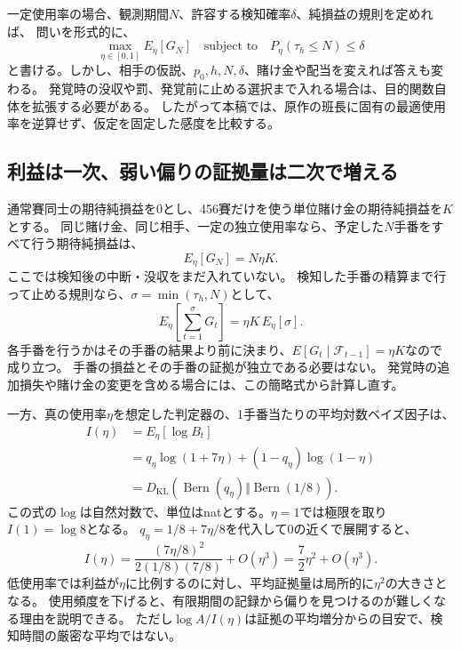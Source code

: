 \documentclass[11pt,a4paper]{article}
\numberwithin{equation}{section}
\begin{document}
一定使用率の場合、観測期間$N$、許容する検知確率$\delta$、純損益の規則を定めれば、
問いを形式的に、
\begin{equation}
\max_{\eta\in[0,1]}E_\eta[G_N]\quad
\text{subject to}\quad P_\eta(\tau_h\le N)\le\delta
\label{eq:tradeoff}
\end{equation}
と書ける。しかし、相手の仮説、$p_0,h,N,\delta$、賭け金や配当を変えれば答えも変わる。
発覚時の没収や罰、発覚前に止める選択まで入れる場合は、目的関数自体を拡張する必要がある。
したがって本稿では、原作の班長に固有の最適使用率を逆算せず、仮定を固定した感度を比較する。

\subsection{利益は一次、弱い偏りの証拠量は二次で増える}
通常賽同士の期待純損益を0とし、456賽だけを使う単位賭け金の期待純損益を$K$とする。
同じ賭け金、同じ相手、一定の独立使用率なら、予定した$N$手番をすべて行う期待純損益は、
\begin{equation}
E_\eta[G_N]=N\eta K.
\label{eq:linear-gain}
\end{equation}
ここでは検知後の中断・没収をまだ入れていない。
検知した手番の精算まで行って止める規則なら、$\sigma=\min(\tau_h,N)$として、
\begin{equation}
E_\eta\!\left[\sum_{t=1}^{\sigma}G_t\right]
=\eta K\,E_\eta[\sigma].
\end{equation}
各手番を行うかはその手番の結果より前に決まり、$E[G_t\mid\mathcal F_{t-1}]=\eta K$なので成り立つ。
手番の損益とその手番の証拠が独立である必要はない。
発覚時の追加損失や賭け金の変更を含める場合には、この簡略式から計算し直す。

一方、真の使用率$\eta$を想定した判定器の、1手番当たりの平均対数ベイズ因子は、
\begin{align}
I(\eta)&=E_\eta[\log B_t]\\
&=q_\eta\log(1+7\eta)+(1-q_\eta)\log(1-\eta)\\
&=D_{\mathrm{KL}}\!\left(\operatorname{Bern}(q_\eta)\Vert
                         \operatorname{Bern}(1/8)\right).
\label{eq:information-rate}
\end{align}
この式の$\log$は自然対数で、単位はnatとする。$\eta=1$では極限を取り$I(1)=\log8$となる。
$q_\eta=1/8+7\eta/8$を代入して0の近くで展開すると、
\begin{equation}
I(\eta)=\frac{(7\eta/8)^2}{2(1/8)(7/8)}+O(\eta^3)
=\frac72\eta^2+O(\eta^3).
\end{equation}
低使用率では利益が$\eta$に比例するのに対し、平均証拠量は局所的に$\eta^2$の大きさとなる。
使用頻度を下げると、有限期間の記録から偏りを見つけるのが難しくなる理由を説明できる。
ただし$\log A/I(\eta)$は証拠の平均増分からの目安で、検知時間の厳密な平均ではない。
\end{document}
